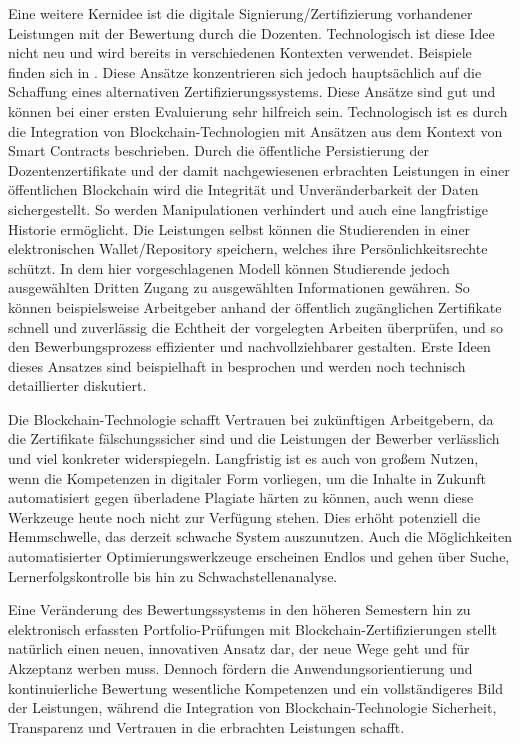 \documentclass[conference]{IEEEtran}
\begin{document}
Eine weitere Kernidee ist die digitale Signierung/Zertifizierung vorhandener Leistungen mit der Bewertung durch die Dozenten.  Technologisch ist diese Idee nicht neu und wird bereits in verschiedenen Kontexten verwendet. Beispiele finden sich in \cite{alammary2019blockchain}. Diese Ansätze konzentrieren sich jedoch hauptsächlich auf die Schaffung eines alternativen Zertifizierungssystems. Diese Ansätze sind gut und können bei einer ersten Evaluierung sehr hilfreich sein. Technologisch ist  es durch die Integration von Blockchain-Technologien mit Ansätzen aus dem Kontext von Smart Contracts beschrieben. Durch die öffentliche Persistierung der Dozentenzertifikate und der damit nachgewiesenen erbrachten Leistungen in einer öffentlichen Blockchain wird die Integrität und Unveränderbarkeit der Daten sichergestellt. So werden Manipulationen verhindert und auch eine langfristige Historie ermöglicht. Die Leistungen selbst können die Studierenden in einer elektronischen Wallet/Repository speichern, welches ihre Persönlichkeitsrechte schützt. In dem hier vorgeschlagenen Modell können Studierende jedoch ausgewählten Dritten Zugang zu ausgewählten Informationen gewähren.  So können beispielsweise Arbeitgeber anhand der öffentlich zugänglichen Zertifikate schnell und zuverlässig die Echtheit der vorgelegten Arbeiten überprüfen, und so  den Bewerbungsprozess effizienter und nachvollziehbarer gestalten. Erste Ideen dieses Ansatzes sind beispielhaft in \cite{Idee} besprochen und werden noch technisch detaillierter diskutiert.

Die Blockchain-Technologie schafft Vertrauen bei zukünftigen Arbeitgebern, da die Zertifikate fälschungssicher sind und die Leistungen der Bewerber verlässlich und viel konkreter widerspiegeln. Langfristig ist es auch von großem Nutzen, wenn die Kompetenzen in digitaler Form vorliegen, um die Inhalte in Zukunft automatisiert gegen überladene Plagiate härten zu können, auch wenn diese Werkzeuge heute noch nicht zur Verfügung stehen. Dies erhöht potenziell die Hemmschwelle, das derzeit schwache System auszunutzen. Auch die Möglichkeiten automatisierter Optimierungswerkzeuge erscheinen Endlos und gehen über Suche, Lernerfolgskontrolle bis hin zu Schwachstellenanalyse. 

Eine Veränderung des Bewertungssystems in den höheren Semestern hin zu elektronisch erfassten Portfolio-Prüfungen mit Blockchain-Zertifizierungen stellt natürlich einen neuen, innovativen Ansatz dar, der neue Wege geht und für Akzeptanz werben muss. Dennoch fördern die Anwendungsorientierung und kontinuierliche Bewertung wesentliche Kompetenzen und ein vollständigeres Bild der Leistungen, während die Integration von Blockchain-Technologie Sicherheit, Transparenz und Vertrauen in die erbrachten Leistungen schafft.
\end{document}
